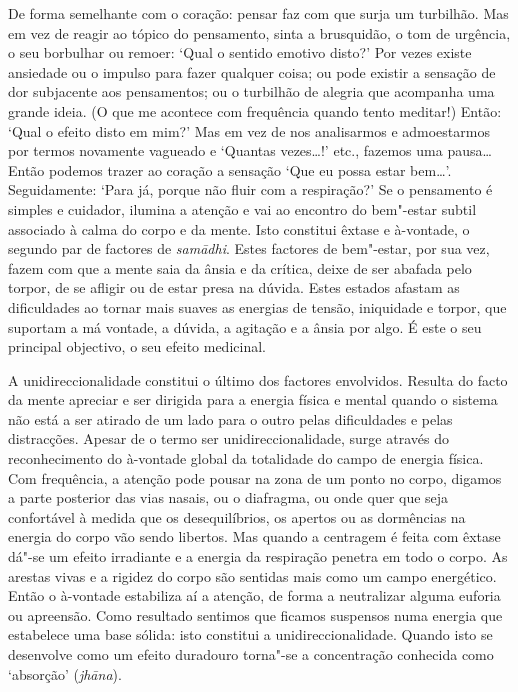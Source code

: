 De forma semelhante com o coração: pensar faz com que surja um turbilhão. Mas em
vez de reagir ao tópico do pensamento, sinta a brusquidão, o tom de urgência, o
seu borbulhar ou remoer: `Qual o sentido emotivo disto?' Por vezes existe
ansiedade ou o impulso para fazer qualquer coisa; ou pode existir a sensação de
dor subjacente aos pensamentos; ou o turbilhão de alegria que acompanha uma
grande ideia. (O que me acontece com frequência quando tento meditar!) Então:
`Qual o efeito disto em mim?' Mas em vez de nos analisarmos e admoestarmos por
termos novamente vagueado e `Quantas vezes\ldots{}!' etc., fazemos uma pausa\ldots{} Então
podemos trazer ao coração a sensação `Que eu possa estar bem\ldots{}'. Seguidamente:
`Para já, porque não fluir com a respiração?' Se o pensamento é simples e
cuidador, ilumina a atenção e vai ao encontro do bem"-estar subtil associado à
calma do corpo e da mente. Isto constitui êxtase e à-vontade, o segundo par de
factores de \emph{samādhi}. Estes factores de bem"-estar, por sua vez, fazem com
que a mente saia da ânsia e da crítica, deixe de ser abafada pelo torpor, de se
afligir ou de estar presa na dúvida. Estes estados afastam as dificuldades ao
tornar mais suaves as energias de tensão, iniquidade e torpor, que suportam a má
vontade, a dúvida, a agitação e a ânsia por algo. É este o seu principal
objectivo, o seu efeito medicinal.

\enlargethispage{\baselineskip}

A unidireccionalidade constitui o último dos factores envolvidos. Resulta do
facto da mente apreciar e ser dirigida para a energia física e mental quando o
sistema não está a ser atirado de um lado para o outro pelas dificuldades e
pelas distracções. Apesar de o termo ser unidireccionalidade, surge através do
reconhecimento do à-vontade global da totalidade do campo de energia física. Com
frequência, a atenção pode pousar na zona de um ponto no corpo, digamos a parte
posterior das vias nasais, ou o diafragma, ou onde quer que seja confortável à
medida que os desequilíbrios, os apertos ou as dormências na energia do corpo
vão sendo libertos. Mas quando a centragem é feita com êxtase dá"-se um efeito
irradiante e a energia da respiração penetra em todo o corpo. As arestas vivas e
a rigidez do corpo são sentidas mais como um campo energético. Então o à-vontade
estabiliza aí a atenção, de forma a neutralizar alguma euforia ou apreensão.
Como resultado sentimos que ficamos suspensos numa energia que estabelece uma
base sólida: isto constitui a unidireccionalidade. Quando isto se desenvolve
como um efeito duradouro torna"-se a concentração conhecida como `absorção'
(\emph{jhāna}).

